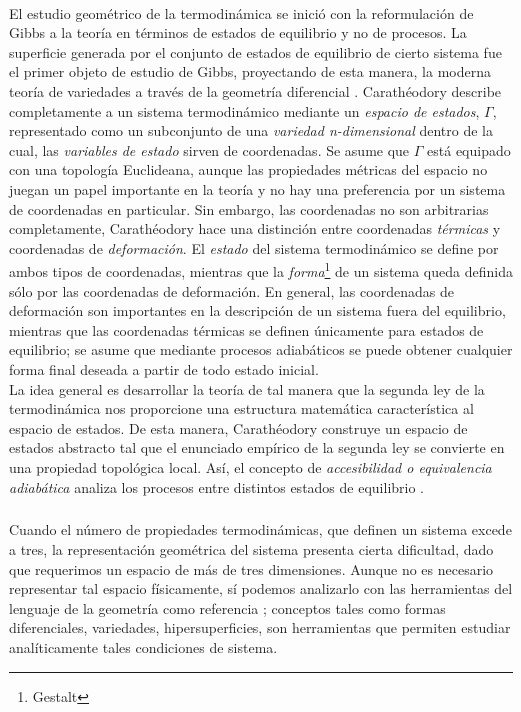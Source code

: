 \documentclass{article}
\theoremstyle{definition} \newtheorem{defi}{Definici\'on}
\theoremstyle{definition} \newtheorem{teo}{Teorema}
\theoremstyle{definition} \newtheorem{cor}{Corolario}
\begin{document}
\paragraph{}
El estudio geom\'etrico de la termodin\'amica se inici\'o con la reformulaci\'on de Gibbs a la teor\'ia en t\'erminos de estados de equilibrio y no de procesos. La superficie generada por el conjunto de estados de equilibrio de cierto sistema fue el primer objeto de estudio de Gibbs, proyectando de esta manera, la moderna teor\'ia de variedades a trav\'es de la geometr\'ia diferencial \cite{gt}.  Carath\'eodory describe completamente a un sistema termodin\'amico mediante un \emph{espacio de estados}, $\Gamma$, representado como un subconjunto de una \emph{variedad n-dimensional} dentro de la cual, las \emph{variables de estado} sirven de coordenadas. Se asume que $\Gamma$ est\'a equipado con una topolog\'ia Euclideana, aunque las propiedades m\'etricas del espacio no juegan un papel importante en la teor\'ia y no hay una preferencia por un sistema de coordenadas en particular. Sin embargo, las coordenadas no son arbitrarias completamente, Carath\'eodory hace una distinci\'on entre coordenadas \emph{t\'ermicas} y coordenadas de \emph{deformaci\'on}. El \emph{estado} del sistema termodin\'amico se define por ambos tipos de coordenadas, mientras que la \emph{forma}\footnote{Gestalt} de un sistema queda definida s\'olo por las coordenadas de deformaci\'on. En general, las coordenadas de deformaci\'on son importantes en la descripci\'on de un sistema fuera del equilibrio, mientras que las coordenadas t\'ermicas se definen \'unicamente para estados de equilibrio; se asume que mediante procesos adiab\'aticos se puede obtener cualquier forma final deseada a partir de todo estado inicial.\\
La idea general es desarrollar la teor\'ia de tal manera que la segunda ley de la termodin\'amica nos proporcione una estructura matem\'atica caracter\'istica al espacio de estados. De esta manera, Carath\'eodory construye un espacio de estados abstracto tal que el enunciado emp\'irico de la segunda ley se convierte en una propiedad topol\'ogica local. As\'i, el concepto de \emph{accesibilidad o equivalencia adiab\'atica} analiza los procesos entre distintos estados de equilibrio \cite{UJ}.
\subparagraph{}
Cuando el n\'umero de propiedades termodin\'amicas, que definen un sistema excede a tres, la representaci\'on geom\'etrica del sistema presenta cierta dificultad, dado que requerimos un espacio de m\'as de tres dimensiones. Aunque no es necesario representar tal espacio f\'isicamente, s\'i podemos analizarlo con las herramientas del lenguaje de la geometr\'ia como referencia \cite{tc}; conceptos tales como formas diferenciales, variedades, hipersuperficies, son herramientas que permiten estudiar anal\'iticamente tales condiciones de sistema.
\end{document}
